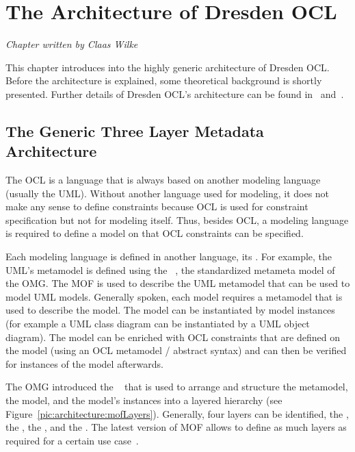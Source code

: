\chapter{The Architecture of Dresden OCL}
\label{chapter:architecture}

\begin{flushright}
\textit{Chapter written by Claas Wilke}
\end{flushright}

This chapter introduces into the highly generic architecture of Dresden OCL.
Before the architecture is explained, some theoretical background is shortly 
presented. Further details of Dresden OCL's architecture can be found
in~\cite{braeuerEA:OCL2007} and~\cite{wilkeEA:MODELS2010}.



\section{The Generic Three Layer Metadata Architecture}
\label{architecture:genericLayers}

The OCL is a language that is always based on another modeling language (usually
the UML). Without another language used for modeling, it does not make any
sense to define constraints because OCL is used for constraint specification
but not for modeling itself. Thus, besides OCL, a modeling language is required
to define a model on that OCL constraints can be specified.

Each modeling language is defined in another language, its 
. For example, the UML's metamodel is defined
using the ~\cite{spec:MOF2.0}, the standardized metameta
model of the OMG. The MOF is used to describe the UML metamodel that can be
used to model UML models. Generally spoken, each model requires a metamodel
that is used to describe the model. The model can be instantiated by model
instances (for example a UML class diagram can be instantiated by a UML object
diagram). The model can be enriched with OCL constraints that are defined on
the model (using an OCL metamodel / abstract syntax) and can then be verified
for instances of the model afterwards.

The OMG introduced the ~\cite{spec:MOF2.0}\cite[p. 16ff]{spec:UML2-2Inf} that is used to
arrange and structure the metamodel, the model, and the model's instances into
a layered hierarchy (see Figure~\ref{pic:architecture:mofLayers}). Generally,
four layers can be identified, the , the
, the , and the
. The latest version of MOF allows to define
as much layers as required for a certain use case~\cite[p.~8f]{spec:MOF2.0}.

